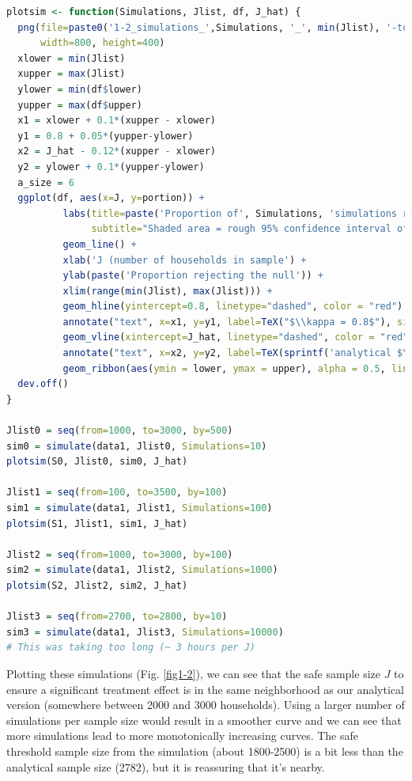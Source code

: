 \documentclass[12pt]{article}
\begin{document}
\begin{lstlisting}[language=R]
plotsim <- function(Simulations, Jlist, df, J_hat) {
  png(file=paste0('1-2_simulations_',Simulations, '_', min(Jlist), '-to-', max(Jlist), '.png'),
      width=800, height=400)
  xlower = min(Jlist)
  xupper = max(Jlist)
  ylower = min(df$lower)
  yupper = max(df$upper)
  x1 = xlower + 0.1*(xupper - xlower)
  y1 = 0.8 + 0.05*(yupper-ylower)
  x2 = J_hat - 0.12*(xupper - xlower)
  y2 = ylower + 0.1*(yupper-ylower)
  a_size = 6
  ggplot(df, aes(x=J, y=portion)) +
          labs(title=paste('Proportion of', Simulations, 'simulations rejecting the null when sampling from J households'),
               subtitle="Shaded area = rough 95% confidence interval of portions") +
          geom_line() +
          xlab('J (number of households in sample') +
          ylab(paste('Proportion rejecting the null')) +
          xlim(range(min(Jlist), max(Jlist))) +
          geom_hline(yintercept=0.8, linetype="dashed", color = "red") +
          annotate("text", x=x1, y=y1, label=TeX("$\\kappa = 0.8$"), size=a_size) +
          geom_vline(xintercept=J_hat, linetype="dashed", color = "red") +
          annotate("text", x=x2, y=y2, label=TeX(sprintf('analytical $\\hat{J} = %d$', round(J_hat))), size=a_size) +
          geom_ribbon(aes(ymin = lower, ymax = upper), alpha = 0.5, linetype="dashed", color="green")
  dev.off()
}

Jlist0 = seq(from=1000, to=3000, by=500)
sim0 = simulate(data1, Jlist0, Simulations=10)
plotsim(S0, Jlist0, sim0, J_hat)

Jlist1 = seq(from=100, to=3500, by=100)
sim1 = simulate(data1, Jlist1, Simulations=100)
plotsim(S1, Jlist1, sim1, J_hat)

Jlist2 = seq(from=1000, to=3000, by=100)
sim2 = simulate(data1, Jlist2, Simulations=1000)
plotsim(S2, Jlist2, sim2, J_hat)

Jlist3 = seq(from=2700, to=2800, by=10)
sim3 = simulate(data1, Jlist3, Simulations=10000)
# This was taking too long (~ 3 hours per J)
\end{lstlisting}

Plotting these simulations (Fig. \ref{fig1-2}), we can see that the safe sample size $J$ to ensure a significant treatment effect is in the same neighborhood as our analytical version (somewhere between 2000 and 3000 households). Using a larger number of simulations per sample size would result in a smoother curve and we can see that more simulations lead to more monotonically increasing curves. The safe threshold sample size from the simulation (about 1800-2500) is a bit less than the analytical sample size (2782), but it is reassuring that it's nearby. 
\end{document}

